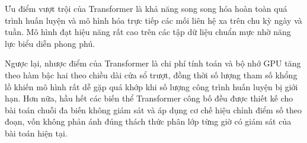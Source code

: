 Ưu điểm vượt trội của Transformer là khả năng song song hóa hoàn toàn quá trình huấn luyện và mô hình hóa trực tiếp các mối liên hệ xa trên chu kỳ ngày và tuần. Mô hình đạt hiệu năng rất cao trên các tập dữ liệu chuẩn mực nhờ năng lực biểu diễn phong phú.

Ngược lại, nhược điểm của Transformer là chi phí tính toán và bộ nhớ GPU tăng theo hàm bậc hai theo chiều dài cửa sổ trượt, đồng thời số lượng tham số khổng lồ khiến mô hình rất dễ gặp quá khớp khi số lượng công trình huấn luyện bị giới hạn. Hơn nữa, hầu hết các biến thể Transformer công bố đều được thiết kế cho bài toán chuỗi đa biến không giám sát và áp dụng cơ chế hiệu chỉnh điểm số theo đoạn, vốn không phản ánh đúng thách thức phân lớp từng giờ có giám sát của bài toán hiện tại.
